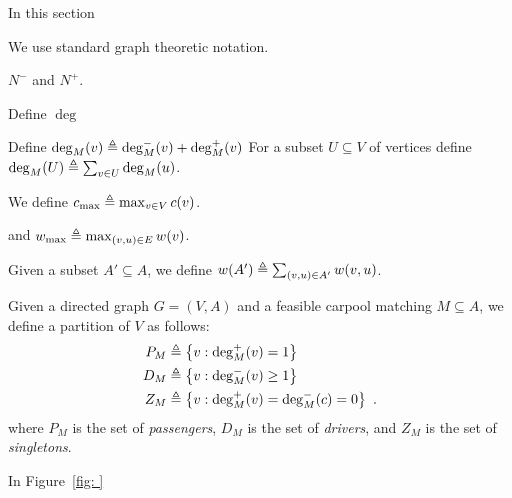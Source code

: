 
In this section

We use standard graph theoretic notation.

$N^-$ and $N^+$.



Define $\deg$

Define $\deg_M(v) \eqdf \din[M](v) + \dout[M](v)$
%
For a subset $U \subseteq V$ of vertices define
$\deg_M(U) \eqdf \sum_{v \in U} \deg_M(u)$.


We define $c_{\max} \eqdf \max_{v \in V} c(v)$.

and $w_{\max} \eqdf \max_{(v,u) \in E} w(v)$.

Given a subset $A' \subseteq A$, we define
$w(A') \eqdf \sum_{(v,u) \in A'} w(v,u)$.


Given a directed graph $G = (V,A)$ and a feasible carpool matching
$M \subseteq A$, we define a partition of $V$ as follows:
\begin{align*}
P_M & \eqdf \set{v : \dout[M](v) = 1} \\
D_M & \eqdf \set{v : \din[M](v) \geq 1} \\
Z_M & \eqdf \set{v : \dout[M](v) = \din[M](c) = 0}
~.
\end{align*}
where $P_M$ is the set of \emph{passengers}, $D_M$ is the set of
\emph{drivers}, and $Z_M$ is the set of \emph{singletons}.

In Figure~\ref{fig: }

